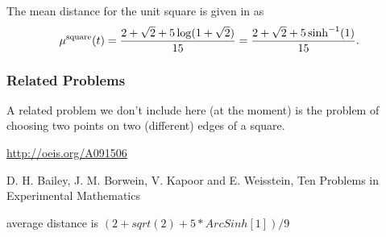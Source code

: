 The mean distance for the unit square is given in \cite{Bailey2007196}
as 
\begin{equation}
  \label{eq:square_mean}
  \mu^{\rm square}(t)
      = \frac{2 + \sqrt{2} + 5 \log(1+\sqrt{2})}{15}
      = \frac{2 + \sqrt{2} + 5\sinh^{-1}(1)}{15}.
\end{equation}



\subsubsection{Related Problems}

A related problem we don't include here (at the moment) is the problem
of choosing two points on two (different) edges of a square.

\url{http://oeis.org/A091506}

D. H. Bailey, J. M. Borwein, V. Kapoor and E. Weisstein, Ten Problems
in Experimental Mathematics

average distance is $(2 + sqrt(2) + 5*ArcSinh[1])/9$

